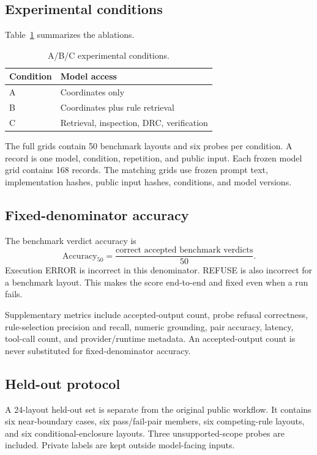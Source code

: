 \documentclass[10pt,twocolumn]{article}
\begin{document}
\subsection{Experimental conditions}
Table~\ref{tab:conditions} summarizes the ablations.
\begin{table}[h]
\centering
\caption{A/B/C experimental conditions.}
\label{tab:conditions}
\small
\begin{tabular}{ll}
\toprule
Condition & Model access \\
\midrule
A & Coordinates only \\
B & Coordinates plus rule retrieval \\
C & Retrieval, inspection, DRC, verification \\
\bottomrule
\end{tabular}
\end{table}

The full grids contain 50 benchmark layouts and six probes per condition. A record
is one model, condition, repetition, and public input. Each frozen model grid contains
168 records. The matching grids use frozen prompt text, implementation hashes, public
input hashes, conditions, and model versions.

\subsection{Fixed-denominator accuracy}
The benchmark verdict accuracy is
\[
\mathrm{Accuracy}_{50}=
\frac{\text{correct accepted benchmark verdicts}}{50}.
\]
Execution ERROR is incorrect in this denominator. REFUSE is also incorrect for a
benchmark layout. This makes the score end-to-end and fixed even when a run fails.

Supplementary metrics include accepted-output count, probe refusal correctness,
rule-selection precision and recall, numeric grounding, pair accuracy, latency,
tool-call count, and provider/runtime metadata. An accepted-output count is never
substituted for fixed-denominator accuracy.

\subsection{Held-out protocol}
A 24-layout held-out set is separate from the original public workflow. It contains
six near-boundary cases, six pass/fail-pair members, six competing-rule layouts,
and six conditional-enclosure layouts. Three unsupported-scope probes are included.
Private labels are kept outside model-facing inputs.
\end{document}
